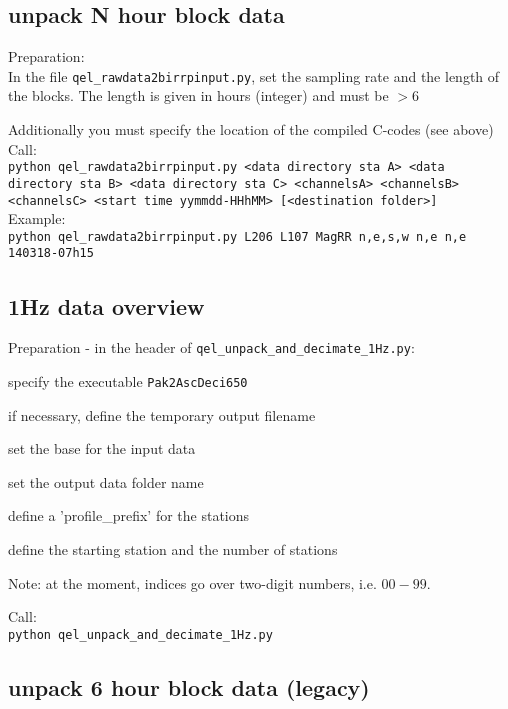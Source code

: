 \documentclass[11pt,DIV=12]{scrartcl}
\begin{document}
\subsection{unpack N hour block data}

Preparation:\\
In the file \texttt{qel\_rawdata2birrpinput.py}, set the sampling rate and the length of the blocks. The length is given in hours (integer) and must be $>6$ 

Additionally you must specify the location of the compiled C-codes (see above)\\

Call:\\

\texttt{python qel\_rawdata2birrpinput.py <data directory sta A> <data directory sta B> <data directory sta C>   <channelsA> <channelsB> <channelsC>  <start time yymmdd-HHhMM> [<destination folder>] }\\
        
Example:\\

\texttt{python qel\_rawdata2birrpinput.py L206 L107 MagRR n,e,s,w n,e n,e 140318-07h15}


\subsection{1Hz data overview}

Preparation - in the header of \texttt{qel\_unpack\_and\_decimate\_1Hz.py}:

\begin{itemize*}
\item specify the executable \texttt{Pak2AscDeci650}
\item if necessary, define the temporary output filename 
\item set the base for the input data
\item set the output data folder name
\item define a 'profile\_prefix' for the stations
\item define the starting station and the number of stations
\end{itemize*}
Note: at the moment, indices go over two-digit numbers, i.e. $00 - 99$.

Call:\\

\texttt{python qel\_unpack\_and\_decimate\_1Hz.py}


\subsection{unpack 6 hour block data (legacy)}
\end{document}
